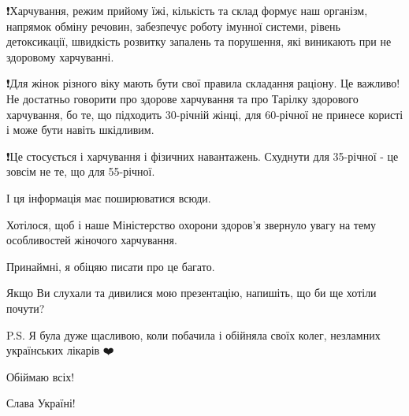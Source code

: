 ❗️Харчування, режим прийому їжі, кількість та склад формує наш організм,
напрямок обміну речовин, забезпечує роботу імунної системи, рівень
детоксикації, швидкість розвитку запалень та порушення, які виникають при не
здоровому харчуванні.

❗️Для жінок різного віку мають бути свої правила складання раціону. Це важливо!
Не достатньо говорити про здорове харчування та про Тарілку здорового
харчування, бо те, що підходить 30-річній жінці, для 60-річної не принесе
користі і може бути навіть шкідливим. 

❗️Це стосується і харчування і фізичних навантажень. Схуднути для 35-річної -
це зовсім не те, що для 55-річної. 

І ця інформація має поширюватися всюди. 

Хотілося, щоб і наше Міністерство охорони здоров'я звернуло увагу на тему
особливостей жіночого харчування.

Принаймні, я обіцяю писати про це багато.

Якщо Ви слухали та дивилися мою презентацію, напишіть, що би ще хотіли почути?

P.S. Я була дуже щасливою, коли побачила і обійняла своїх колег, незламних
українських лікарів ❤️

Обіймаю всіх!

Слава Україні!

